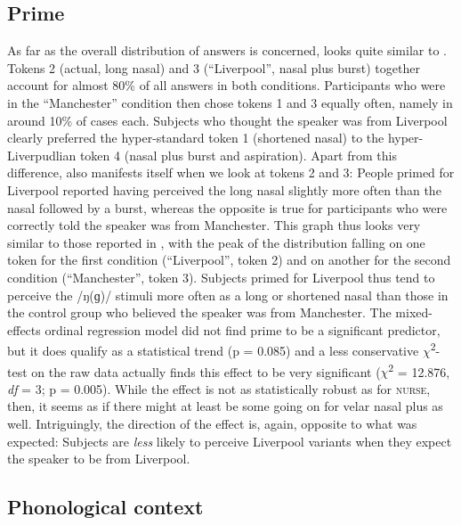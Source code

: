 \subsection{Prime}
\label{sec.perc_res.ng.prime}



As far as the overall distribution of answers is concerned,  looks quite similar to .
Tokens 2 (actual, long nasal) and 3 (``Liverpool'', nasal plus burst) together account for almost 80\% of all answers in both conditions.
Participants who were in the ``Manchester'' condition then chose tokens 1 and 3 equally often, namely in around 10\% of cases each.
Subjects who thought the speaker was from Liverpool clearly preferred the hyper-standard token 1 (short\-ened nasal) to the hyper-Liverpudlian token 4 (nasal plus burst and aspiration).
Apart from this difference,  also manifests itself when we look at tokens 2 and 3: People primed for Liverpool reported having perceived the long nasal slightly more often than the nasal followed by a burst, whereas the opposite is true for participants who were correctly told the speaker was from Manchester.
This graph thus looks very similar to those reported in \citealt{hayetal2006a, haydrager2010}, with the peak of the distribution falling on one token for the first condition (``Liverpool'', token 2) and on another for the second condition (``Manchester'', token 3).
Subjects primed for Liverpool thus tend to perceive the /ŋ(ɡ)/ stimuli more often as a long or shortened nasal than those in the control group who believed the speaker was from Manchester.
The mixed-effects ordinal regression model did not find prime to be a significant predictor, but it does qualify as a statistical trend (p = 0.085) and a less conservative \(\chi\)\textsuperscript{2}-test on the raw data actually finds this effect to be very significant (\(\chi\)\textsuperscript{2} = 12.876, \emph{df} = 3; p = 0.005).
While the effect is not as statistically robust as for \textsc{nurse}, then, it seems as if there might at least be some  going on for velar nasal plus as well.
Intriguingly, the direction of the effect is, again, opposite to what was expected: Subjects are \emph{less} likely to perceive Liverpool variants when they expect the speaker to be from Liverpool.

\subsection{Phonological context}
\label{sec.perc_res.ng.phon}



